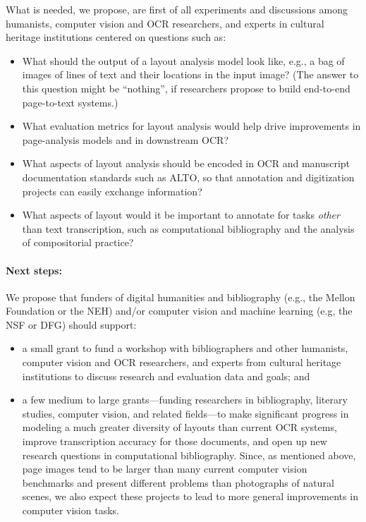 \documentclass[twoside,11pt]{report}
\begin{document}
What is needed, we propose, are first of all experiments and discussions among humanists, computer vision and OCR researchers, and experts in cultural heritage institutions centered on questions such as:
\begin{itemize}

\item What should the output of a layout analysis model look like, e.g., a bag of images of lines of text and their locations in the input image? (The answer to this question might be ``nothing'', if researchers propose to build end-to-end page-to-text systems.)

\item What evaluation metrics for layout analysis would help drive improvements in page-analysis models and in downstream OCR?

\item What aspects of layout analysis should be encoded in OCR and manuscript documentation standards such as ALTO, so that annotation and digitization projects can easily exchange information?

\item What aspects of layout would it be important to annotate for tasks \emph{other} than text transcription, such as computational bibliography and the analysis of compositorial practice?

\end{itemize}

\paragraph{Next steps:} We propose that funders of digital humanities and bibliography (e.g., the Mellon Foundation or the NEH) and/or computer vision and machine learning (e.g, the NSF or DFG) should support:
\begin{itemize}

\item a small grant to fund a workshop with bibliographers and other humanists, computer vision and OCR researchers, and experts from cultural heritage institutions to discuss research and evaluation data and goals; and

\item a few medium to large grants---funding researchers in bibliography, literary studies, computer vision, and related fields---to make significant progress in modeling a much greater diversity of layouts than current OCR systems, improve transcription accuracy for those documents, and open up new research questions in computational bibliography. Since, as mentioned above, page images tend to be larger than many current computer vision benchmarks and present different problems than photographs of natural scenes, we also expect these projects to lead to more general improvements in computer vision tasks.

\end{itemize}
\end{document}
